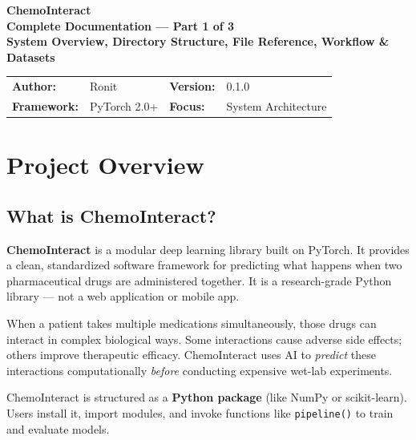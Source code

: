\documentclass[12pt,a4paper,oneside]{article}
\begin{document}
\begin{center}
{\Huge\bfseries\color{deepblue} ChemoInteract}\\[0.3cm]
{\Large\bfseries\color{chemopurple} Complete Documentation --- Part 1 of 3}\\[0.2cm]
{\large\textbf{System Overview, Directory Structure, File Reference, Workflow \& Datasets}}\\[0.4cm]
\begin{tcolorbox}[enhanced,width=14cm,colback=deepblue!5,colframe=deepblue,boxrule=1pt,arc=5pt]
\centering
\begin{tabular}{llll}
\textbf{Author:} & Ronit & \textbf{Version:} & 0.1.0 \\
\textbf{Framework:} & PyTorch 2.0+ & \textbf{Focus:} & System Architecture \\
\end{tabular}
\end{tcolorbox}
\end{center}

\tableofcontents
\newpage

\section{Project Overview}\label{sec:overview}

\subsection{What is ChemoInteract?}
\textbf{ChemoInteract} is a modular deep learning library built on PyTorch. It provides a clean, standardized software framework for predicting what happens when two pharmaceutical drugs are administered together. It is a research-grade Python library --- not a web application or mobile app.

When a patient takes multiple medications simultaneously, those drugs can interact in complex biological ways. Some interactions cause adverse side effects; others improve therapeutic efficacy. ChemoInteract uses AI to \textit{predict} these interactions computationally \textit{before} conducting expensive wet-lab experiments.

\begin{tcolorbox}[notebox]
ChemoInteract is structured as a \textbf{Python package} (like NumPy or scikit-learn). Users install it, import modules, and invoke functions like \texttt{pipeline()} to train and evaluate models.
\end{tcolorbox}
\end{document}
